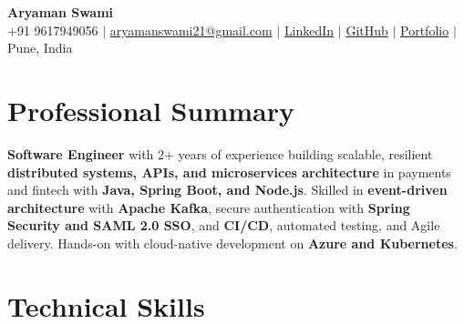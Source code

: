 \documentclass[letterpaper,10pt]{article}
\makeatletter
\newcommand{\resumeEmail}{aryamanswami21@gmail.com}
\makeatother
\begin{document}

\begin{center}
    {\Huge \textbf{Aryaman Swami}} \\ \vspace{3pt}
    \small
    +91 9617949056 $|$
    \href{mailto:\resumeEmail}{\resumeEmail} $|$
    \href{https://linkedin.com/in/aryaman-swami}
    {LinkedIn} $|$
    \href{https://github.com/Aryaman-Swami}
    {GitHub} $|$
    \href{https://aryaman-swami.netlify.app/}
    {Portfolio} $|$
    Pune, India
\end{center}

\vspace{-8pt}


\section{Professional Summary}

{\small
\textbf{Software Engineer} with 2+ years of experience building scalable,
resilient \textbf{distributed systems, APIs, and microservices architecture}
in payments and fintech with \textbf{Java, Spring Boot, and Node.js}.
Skilled in \textbf{event-driven architecture} with \textbf{Apache Kafka},
secure authentication with \textbf{Spring Security and SAML 2.0 SSO},
and \textbf{CI/CD}, automated testing, and Agile delivery. Hands-on with
cloud-native development on \textbf{Azure and Kubernetes}.
}


\section{Technical Skills}
\end{document}
